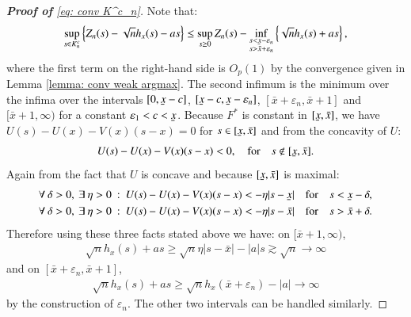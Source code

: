 \begin{proof}[\hypertarget{proof of lemma conv K^c_n}{\textbf{Proof of}} \eqref{eq: conv K^c_n}]
    Note that:
    \begin{align*}
        \sup_{s \in K^c_n} \left\{ Z_n(s) - \sqrt{n} h_x(s)-as \right\} \leq \sup_{s \geq 0} Z_n(s) - \inf_{\substack{s < \ubar{x}-\varepsilon_n \\ s > \bar{x}+\varepsilon_n}} \left\{ \sqrt{n} h_x(s) + as\right\},
    \end{align*}
    where the first term on the right-hand side is $O_p(1)$ by the convergence given in Lemma \ref{lemma: conv weak argmax}. The second infimum is the minimum over the infima over the intervals $[0, \ubar{x}-c]$, $[\ubar{x}-c, \ubar{x}-\varepsilon_n]$, $[\bar{x}+\varepsilon_n,\bar{x}+1]$ and $[\bar{x}+1, \infty)$ for a constant $\varepsilon_1<c<\ubar{x}$. Because $F^*$ is constant in $[\ubar{x},\bar{x}]$, we have $U(s)-U(x)-V(x)(s-x)= 0$ for $s \in [\ubar{x},\bar{x}]$ and from the concavity of $U$:
    \begin{align*}
        U(s)-U(x)-V(x)(s-x)< 0,  \quad \text{for} \quad s \notin [\ubar{x},\bar{x}]. 
    \end{align*} 
    Again from the fact that $U$ is concave and because $[\ubar{x},\bar{x}]$ is maximal:
    \begin{align*}
        &\forall \: \delta >0, \: \exists \: \eta >0 \: : \: U(s) - U(x) - V(x)(s-x)< -\eta |s-\ubar{x}| \quad \text{for} \quad s < \ubar{x}- \delta,\\
        &\forall \: \delta >0, \: \exists \: \eta >0 \: : \: U(s) - U(x) - V(x)(s-x)< -\eta |s-\bar{x}| \quad \text{for} \quad s > \bar{x}+ \delta.
    \end{align*} 
    Therefore using these three facts stated above we have: on $[\bar{x}+1,\infty)$,
    \begin{align*}
        \sqrt{n} h_x(s) + as \geq \sqrt{n} \eta |s-\bar{x}|- |a|s \gtrsim \sqrt{n} \rightarrow \infty
    \end{align*}
    and on $[\bar{x}+ \varepsilon_n, \bar{x}+1]$,
    \begin{align*}
        \sqrt{n} h_x(s) + as \geq \sqrt{n} h_x(\bar{x}+\varepsilon_n) - |a| \rightarrow \infty
    \end{align*}
    by the construction of $\varepsilon_n$. The other two intervals can be handled similarly.
\end{proof}

